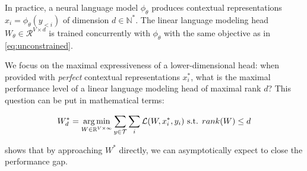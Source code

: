 
In practice, a neural language model $\phi_{\theta}$ produces contextual representations $x_i = \phi_{\theta}(y_{< i})$ of dimension $d \in \mathbb{N}^*$. The linear language modeling head $W_\theta \in \mathcal{R}^{V \times d}$ is trained concurrently with $\phi_{\theta}$ with the same objective as in \autoref{eq:unconstrained}.

We focus on the maximal expressiveness of a lower-dimensional head: when provided with \textit{perfect} contextual representations $x^*_i$, what is the maximal performance level of a linear language modeling head of maximal rank $d$? This question can be put in mathematical terms:

\begin{equation}
W_d^* = \operatorname*{arg\,min}_{W \in \mathbb{R}^{V \times \infty}} \sum_{y \in \mathcal{T}} \sum_{i} \mathcal{L}(W, x^*_i, y_i) \text{ s.t. } rank(W) \leq d
\label{eq:constrained}
\end{equation}





 shows that by approaching $W^*$ directly, we can asymptotically expect to close the performance gap.



